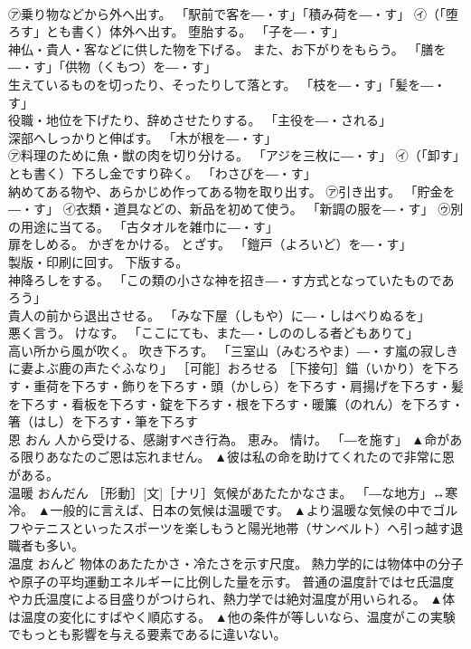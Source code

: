 \documentclass[8pt]{extreport}
\begin{document}
\begin{CJK}{UTF8}{min}
\\	㋐乗り物などから外へ出す。 「駅前で客を―・す」「積み荷を―・す」 ㋑（「堕ろす」とも書く）体外へ出す。 堕胎する。 「子を―・す」 
\\	神仏・貴人・客などに供した物を下げる。 また、お下がりをもらう。 「膳を―・す」「供物（くもつ）を―・す」 
\\	生えているものを切ったり、そったりして落とす。 「枝を―・す」「髪を―・す」 
\\	役職・地位を下げたり、辞めさせたりする。 「主役を―・される」 
\\	深部へしっかりと伸ばす。 「木が根を―・す」 
\\	㋐料理のために魚・獣の肉を切り分ける。 「アジを三枚に―・す」 ㋑（「卸す」とも書く）下ろし金ですり砕く。 「わさびを―・す」 
\\	納めてある物や、あらかじめ作ってある物を取り出す。 ㋐引き出す。 「貯金を―・す」 ㋑衣類・道具などの、新品を初めて使う。 「新調の服を―・す」 ㋒別の用途に当てる。 「古タオルを雑巾に―・す」 
\\	扉をしめる。 かぎをかける。 とざす。 「鎧戸（よろいど）を―・す」 
\\	製版・印刷に回す。 下版する。 
\\	神降ろしをする。 「この類の小さな神を招き―・す方式となっていたものであろう」 
\\	貴人の前から退出させる。 「みな下屋（しもや）に―・しはべりぬるを」 
\\	悪く言う。 けなす。 「ここにても、また―・しののしる者どもありて」 
\\	高い所から風が吹く。 吹き下ろす。 「三室山（みむろやま）―・す嵐の寂しきに妻よぶ鹿の声たぐふなり」 ［可能］おろせる ［下接句］錨（いかり）を下ろす・重荷を下ろす・飾りを下ろす・頭（かしら）を下ろす・肩揚げを下ろす・髪を下ろす・看板を下ろす・錠を下ろす・根を下ろす・暖簾（のれん）を下ろす・箸（はし）を下ろす・筆を下ろす	
\\	恩	おん	人から受ける、感謝すべき行為。 恵み。 情け。 「―を施す」	▲命がある限りあなたのご恩は忘れません。 ▲彼は私の命を助けてくれたので非常に恩がある。
\\	温暖	おんだん	［形動］[文]［ナリ］気候があたたかなさま。 「―な地方」↔寒冷。	▲一般的に言えば、日本の気候は温暖です。 ▲より温暖な気候の中でゴルフやテニスといったスポーツを楽しもうと陽光地帯（サンベルト）へ引っ越す退職者も多い。
\\	温度	おんど	物体のあたたかさ・冷たさを示す尺度。 熱力学的には物体中の分子や原子の平均運動エネルギーに比例した量を示す。 普通の温度計ではセ氏温度やカ氏温度による目盛りがつけられ、熱力学では絶対温度が用いられる。	▲体は温度の変化にすばやく順応する。 ▲他の条件が等しいなら、温度がこの実験でもっとも影響を与える要素であるに違いない。

\end{CJK}
\end{document}
